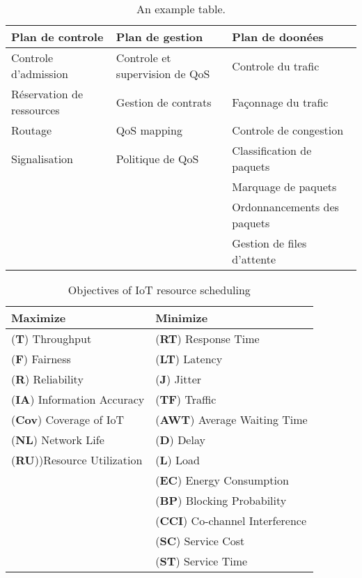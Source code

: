 \begin{table}[h!]
\scriptsize
	\begin{tabulary}{\textwidth}{L|L|L}
		\textbf{Plan de controle}   & \textbf{Plan de gestion}   & 	\textbf{Plan de doonées}  \\\hline
	Controle d'admission      & Controle et supervision de QoS & Controle du trafic         \\
	Réservation de ressources & Gestion de contrats            & Façonnage du trafic        \\
	Routage                   & QoS mapping                    & Controle de congestion     \\
	Signalisation             & Politique de QoS               & Classification de paquets  \\
	\                         &                                & Marquage de paquets        \\
	\                         &                                & Ordonnancements des paquets\\
	\                         &                                & Gestion de files d'attente \\
	\end{tabulary}
	\caption{\label{tab:qos} An example table.}
\end{table}

\begin{table}[h!]
	\begin{tabulary}{\textwidth}{L|L}
	\textbf{Maximize}         & \textbf{Minimize}             \\\hline
	(\textbf{T}) Throughput            & (\textbf{RT}) Response Time            \\
	(\textbf{F}) Fairness              & (\textbf{LT}) Latency                  \\
	(\textbf{R}) Reliability           & (\textbf{J}) Jitter                    \\
	(\textbf{IA}) Information Accuracy & (\textbf{TF})  Traffic                 \\
	(\textbf{Cov}) Coverage of IoT     & (\textbf{AWT}) Average Waiting Time    \\
	(\textbf{NL}) Network Life         & (\textbf{D})  Delay                    \\
	(\textbf{RU}))Resource Utilization & (\textbf{L}) Load                      \\
	\                         & (\textbf{EC}) Energy Consumption       \\
	\                         & (\textbf{BP})  Blocking Probability    \\
	\                         & (\textbf{CCI})  Co-channel Interference\\
	\                         & (\textbf{SC}) Service Cost             \\
	\                         & (\textbf{ST})   Service Time           \\
	\end{tabulary}
\caption{\label{tab:scheduling} Objectives of IoT resource scheduling}
\end{table}

